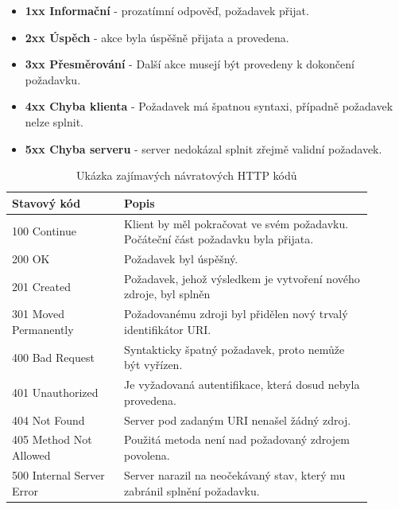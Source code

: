 \begin{itemize}
 	\item \textbf{1xx Informační} - prozatímní odpověď, požadavek přijat.
	\item \textbf{2xx Úspěch} - akce byla úspěšně přijata a provedena.
 	\item \textbf{3xx Přesměrování} - Další akce musejí být provedeny k dokončení požadavku.
 	\item \textbf{4xx Chyba klienta} - Požadavek má špatnou syntaxi, případně požadavek nelze splnit.
 	\item \textbf{5xx Chyba serveru} - server nedokázal splnit zřejmě validní požadavek.
\end{itemize}


\begin{table}[h]
\centering
\begin{tabular}{ |p{0.28\linewidth} | p{0.62\linewidth}| } 
 \hline
Stavový kód & Popis \\ 
 \hline
100 Continue & Klient by měl pokračovat ve svém požadavku. Počáteční část požadavku byla přijata. \\ 
\hline 
200 OK & Požadavek byl úspěšný. \\ 
\hline 
201 Created & Požadavek, jehož výsledkem je vytvoření nového zdroje, byl splněn \\ 
\hline 
301 Moved Permanently & Požadovanému zdroji byl přidělen nový trvalý identifikátor URI.  \\
\hline
400 Bad Request & Syntakticky špatný požadavek, proto nemůže být vyřízen. \\
\hline
401 Unauthorized & Je vyžadovaná autentifikace, která dosud nebyla provedena. \\
\hline
404 Not Found & Server pod zadaným URI nenašel žádný zdroj. \\
\hline
405 Method Not Allowed & Použitá metoda není nad požadovaný zdrojem povolena. \\
\hline
500 Internal Server Error & Server narazil na neočekávaný stav, který mu zabránil splnění požadavku. \\
 \hline
\end{tabular}
\caption{Ukázka zajímavých návratových HTTP kódů}
\label{table_HTTPcodes}
\end{table}









